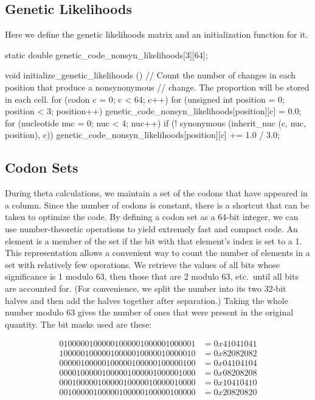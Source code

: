 \documentclass{article}
\begin{document}
    \subsection{Genetic Likelihoods}
      \label{sec:genetic-likelihoods}

      Here we define the genetic likelihoods matrix and an initialization
      function for it.

\begin{ccode}
static double genetic_code_nonsyn_likelihoods[3][64];

void initialize_genetic_likelihoods () {
  // Count the number of changes in each position that produce a nonsynonymous
  // change. The proportion will be stored in each cell.
  for (codon c = 0; c < 64; c++)
    for (unsigned int position = 0; position < 3; position++) {
      genetic_code_nonsyn_likelihoods[position][c] = 0.0;
      for (nucleotide nuc = 0; nuc < 4; nuc++)
	if (! synonymous (inherit_nuc (c, nuc, position), c))
	  genetic_code_nonsyn_likelihoods[position][c] += 1.0 / 3.0;
    }
}
\end{ccode}

    \subsection{Codon Sets}
      \label{sec:codon-sets}

      During theta calculations, we maintain a set of the codons that have
      appeared in a column. Since the number of codons is constant, there is a
      shortcut that can be taken to optimize the code. By defining a codon set
      as a 64-bit integer, we can use number-theoretic operations to yield
      extremely fast and compact code. An element is a member of the set if the
      bit with that element’s index is set to a 1. This representation allows a
      convenient way to count the number of elements in a set with relatively
      few operations. We retrieve the values of all bits whose significance is 1
      modulo 63, then those that are 2 modulo 63, etc.\ until all bits are
      accounted for. (For convenience, we split the number into its two 32-bit
	  halves and then add the halves together after separation.) Taking the
      whole number modulo 63 gives the number of ones that were present in the
      original quantity. The bit masks used are these:

      \begin{align*}
        01000001000001000001000001000001 & = 0x41041041 \\ %
        10000010000010000010000010000010 & = 0x82082082 \\ %
        00000100000100000100000100000100 & = 0x04104104 \\ %
        00001000001000001000001000001000 & = 0x08208208 \\ %
        00010000010000010000010000010000 & = 0x10410410 \\ %
        00100000100000100000100000100000 & = 0x20820820
      \end{align*}
\end{document}
